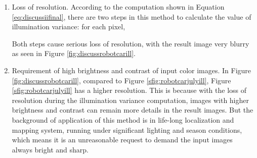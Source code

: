 \begin{enumerate}[1.]
	\item Loss of resolution. According to the computation shown in Equation \ref{eq:discussiifinal}, there are two steps in this method to calculate the value of illumination variance: for each pixel, 
	Both steps cause serious loss of resolution, with the result image very blurry as seen in Figure \ref{fig:discussrobotcarill}. 
	
	\item Requirement of high brightness and contrast of input color images. In Figure \ref{fig:discussrobotcarill}, compared to Figure \ref{sfig:robotcarjulyill}, Figure \ref{sfig:robotcarjulyill} has a higher resolution. This is because with the loss of resolution during the illumination variance computation, images with higher brightness and contrast can remain more details in the result images. But the background of application of this method is in life-long localization and mapping system, running under significant lighting and season conditions, which means it is an unreasonable request to demand the input images always bright and sharp.
	
\end{enumerate}


